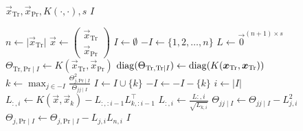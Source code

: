 \begin{algorithmic}[1]
  \REQUIRE \( \vec{x}_\text{Tr}, \vec{x}_\text{Pr}, K(\cdot, \cdot), s \)
  \ENSURE \( I \)

  \STATE \( n \gets \lvert \vec{x}_\text{Tr} \rvert \)
  \STATE \(
    \vec{x} \gets
    \begin{pmatrix}
      \vec{x}_\text{Tr} \\
      \vec{x}_\text{Pr}
    \end{pmatrix}
  \)
  \STATE \( I \gets \emptyset \)
  \STATE \( -I \gets \{ 1, 2, \dotsc, n \} \)
  \STATE \( L \gets \vec{0}^{(n + 1) \times s} \)
  \STATE \(
    \Theta_{\text{Tr}, \text{Pr} \mid I} \gets
    K(\vec{x}_\text{Tr}, \vec{x}_\text{Pr})
  \)
  \STATE \(
    \operatorname{diag}(\Theta_{\text{Tr}, \text{Tr} \mid I}) \gets
    \operatorname{diag}(K(\bm{x}_\text{Tr}, \bm{x}_\text{Tr}))
  \)
    \STATE \(
      k \gets \max_{j \in -I}
      \frac{\Theta_{j, \text{Pr} \mid I}^2}{\Theta_{jj \mid I}}
    \)
    \STATE \( I \gets I \cup \{ k \} \)
    \STATE \( -I \gets -I - \{ k \} \)
    \STATE \( i \gets \lvert I \rvert \)
    \STATE \(
      L_{:, i} \gets
      K(\vec{x}, \vec{x}_k) - L_{:, :i - 1} L_{k, :i - 1}^{\top}
    \)
    \STATE \( L_{:, i} \gets \frac{L{:, i}}{\sqrt{L_{k, i}}} \)
      \STATE \(
        \Theta_{jj \mid I} \gets
        \Theta_{jj \mid I} -
        L_{j, i}^2
      \)
      \STATE \(
        \Theta_{j, \text{Pr} \mid I} \gets
        \Theta_{j, \text{Pr} \mid I} -
        L_{j, i} L_{n, i}
      \)
    \ENDFOR
  \ENDWHILE
  \RETURN \( I \)
\end{algorithmic}
